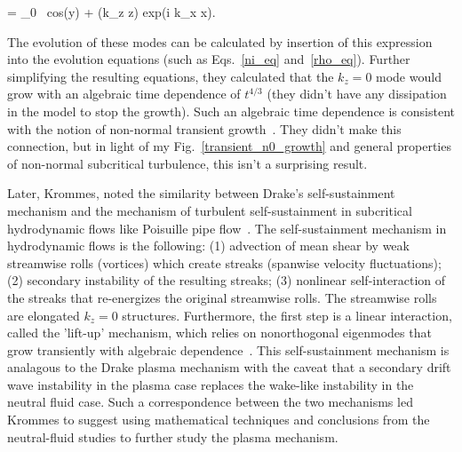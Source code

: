 \beq
\label{drake_potential}
\phi = \phi_0 \ {\rm cos}(\pi y) +  (k_z z) {\rm exp}(i k_x x).
\eeq

The evolution of these modes can be calculated by insertion of this expression into the evolution equations (such as Eqs.~\ref{ni_eq} and~\ref{rho_eq}). Further simplifying the resulting equations, 
they calculated that the $k_z = 0$ mode would grow with an algebraic time dependence of $t^{4/3}$ (they didn't have any dissipation in the model to stop the growth). Such an algebraic time
dependence is consistent with the notion of non-normal transient growth~\cite{waleffe1995}. They didn't make this connection, but in light of my Fig.~\ref{transient_n0_growth} and general
properties of non-normal subcritical turbulence, this isn't a surprising result.

Later, Krommes, noted the similarity between Drake's self-sustainment mechanism and the mechanism of turbulent self-sustainment in subcritical hydrodynamic flows like Poisuille pipe 
flow~\cite{krommes1999}. The self-sustainment mechanism in hydrodynamic flows is the following: (1) advection of mean shear by weak streamwise rolls (vortices) which create streaks (spanwise
velocity fluctuations); (2) secondary instability of the resulting streaks; (3) nonlinear self-interaction of the streaks that re-energizes the original streamwise rolls. The streamwise rolls
are elongated $k_z = 0$ structures. Furthermore, the first step is a linear interaction, called the 'lift-up' mechanism, which relies on nonorthogonal eigenmodes that grow transiently with
algebraic dependence~\cite{trefethen1993,waleffe1995,henningson1996}. This self-sustainment mechanism is analagous to the Drake plasma mechanism with the caveat that a secondary drift wave
instability in the plasma case replaces the wake-like instability in the neutral fluid case. Such a correspondence between the two mechanisms led Krommes to suggest using mathematical techniques
and conclusions from the neutral-fluid studies to further study the plasma mechanism. 
